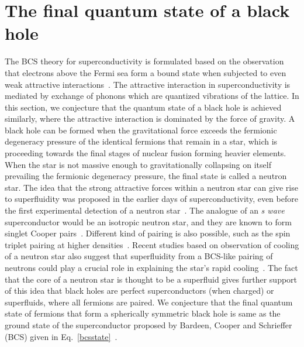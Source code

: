 \documentclass[10pt,letterpaper,aps,onecolumn,superscriptaddress,floatfix,notitlepage]{revtex4-1}
\begin{document}
	\section{The final quantum state of a black hole\label{finalstate}}
	The BCS theory for superconductivity is formulated based on the observation that electrons above the Fermi sea form a bound state when subjected to even weak attractive interactions~\cite{annett2004superconductivity}. The attractive interaction in superconductivity is mediated by exchange of phonons which are quantized vibrations of the lattice. In this section, we conjecture that the quantum state of a black hole is achieved similarly, where the attractive interaction is dominated by the force of gravity. A black hole can be formed when the gravitational force exceeds the fermionic degeneracy pressure of the identical fermions that remain in a star, which is proceeding towards the final stages of nuclear fusion forming heavier elements.  When the star is not massive enough to gravitationally collapsing on itself prevailing the fermionic degeneracy pressure, the final state is called a neutron star. The idea that the strong attractive forces within a neutron star can give rise to superfluidity was proposed in the earlier days of superconductivity, even before the first experimental detection of a neutron star~\cite{neutron1}. The analogue of an \textit{s wave} superconductor would be an isotropic neutron star, and they are known to form singlet Cooper pairs~\cite{superfluidity,stellar}. Different kind of pairing is also possible, such as the spin triplet pairing at higher densities~\cite{stellar}.  Recent studies based on observation of cooling of a neutron star also suggest that superfluidity from a BCS-like pairing of neutrons could play a crucial role in explaining the star's rapid cooling~\cite{neutron2}. The fact that the core of a neutron star is thought to be a superfluid gives further support of this idea that black holes are perfect superconductors (when charged) or superfluids, where all fermions are paired. We conjecture that the final quantum state of fermions that form a spherically symmetric black hole is same as the ground state of the superconductor proposed by Bardeen, Cooper and Schrieffer (BCS) given in Eq.~\eqref{bcsstate}~\cite{BCS}.
	
\end{document}
